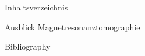 \documentclass[t,9pt]{beamer}
\begin{document}
        \begin{frame}{Inhaltsverzeichnis}
                \tableofcontents[currentsection]
        \end{frame}

        \begin{frame}{Ausblick}
                \pause
                Magnetresonanztomographie        
        \end{frame}

        \begin{frame}[allowframebreaks]{Bibliography}
                \tiny
                
                
        \end{frame}
                
\end{document}
